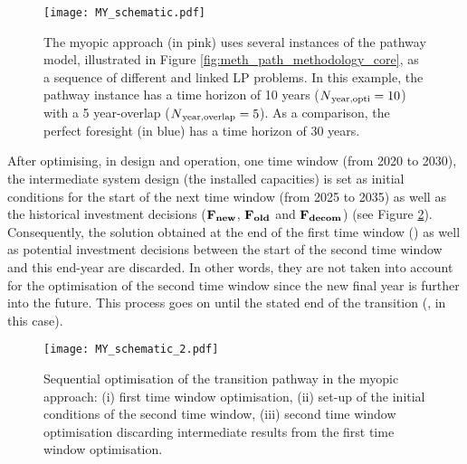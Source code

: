 \begin{figure}[htbp!]
\centering
\texttt{[image: MY\_schematic.pdf]}
\caption{The myopic approach (in pink) uses several instances of the pathway model, illustrated in Figure \ref{fig:meth_path_methodology_core}, as a sequence of different and linked \gls{LP} problems. In this example, the pathway instance has a time horizon of 10 years ($N\textsubscript{year,opti}=10$) with a 5 year-overlap ($N\textsubscript{year,overlap}=5$). As a comparison, the perfect foresight (in blue) has a time horizon of 30 years.}
\label{fig:my_schematic}
\end{figure}

After optimising, in design and operation, one time window (\eg from 2020 to 2030), the intermediate system design (\ie the installed capacities) is set as initial conditions for the start of the next time window (\eg from 2025 to 2035) as well as the historical investment decisions (\ie $\textbf{F\textsubscript{new}}$, $\textbf{F\textsubscript{old}}$ and $\textbf{F\textsubscript{decom}}$) (see Figure \ref{fig:my_schematic_2}). Consequently, the solution obtained at the end of the first time window () as well as potential investment decisions between the start of the second time window and this end-year are discarded. In other words, they are not taken into account for the optimisation of the second time window since the new final year is further into the future. This process goes on until the stated end of the transition (, in this case).

\begin{figure}[htbp!]
\centering
\texttt{[image: MY\_schematic\_2.pdf]}
\caption{Sequential optimisation of the transition pathway in the myopic approach: (i) first time window optimisation, (ii) set-up of the initial conditions of the second time window, (iii) second time window optimisation discarding intermediate results from the first time window optimisation.}
\label{fig:my_schematic_2}
\end{figure}

\\

